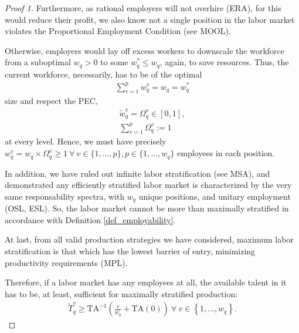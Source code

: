 \documentclass[hidelinks, nonatbib]{elsarticle}
\begin{document}
\begin{lemma}
\begin{proof}[Proof 1]
        Furthermore, as rational employers will not overhire (ERA), for this would reduce their profit, we also know not a single position in the labor market violates the Proportional Employment Condition (see MOOL).
        
        Otherwise, employers would lay off excess workers to downscale the workforce from a suboptimal $w_q > 0$ to some $w_{q}^{*} \leq w_q$, again, to save resources. Thus, the current workforce, necessarily, has to be of the optimal
        \begin{gather}
        \sum_{v=1}^{p}
        w_{q}^{v}
        =
        w_q
        =
        w_{q}^{*}
        \end{gather}
        size and respect the PEC,
        \begin{gather}
        \tilde{w}_{q}^{v}
        =
        \Omega_{q}^{v}
        \in
        [0,1]
        ,
        \\
        \sum_{v=1}^{p}
        \Omega_{q}^{v}
        :=
        1
        \end{gather}
        at every level. Hence, we must have precisely $w_{q}^{v} = w_q \times \Omega_{q}^{v} \geq 1 \ \forall \ v \in \{1,\dots, p\}, p \in \{1,\dots, w_q\}$ employees in each position.
        
        In addition, we have ruled out infinite labor stratification (see MSA), and demonstrated any efficiently stratified labor market is characterized by the very same responsability spectra, with $w_q$ unique positions, and unitary employment (OSL, ESL). So, the labor market cannot be more than maximally stratified in accordance with Definition \ref{def_employability}. 
        
        At last, from all valid production strategies we have considered, maximum labor stratification is that which has the lowest barrier of entry, minimizing productivity requirements (MPL).
        
        Therefore, if a labor market has any employees at all, the available talent in it has to be, at least, sufficient for maximally stratified production:
        \begin{gather}
            \tilde{T}_{q}^{v}
            \geq
            \text{TA}^{-1}\left(
                \frac{v}{w_q}
                +
                \text{TA}(0)
            \right)
            \
            \forall
            \
            v \in 
            \left\{
                1, \dots, w_q
            \right\}
            .
        \end{gather}
    \end{proof}


\end{lemma}
\end{document}
